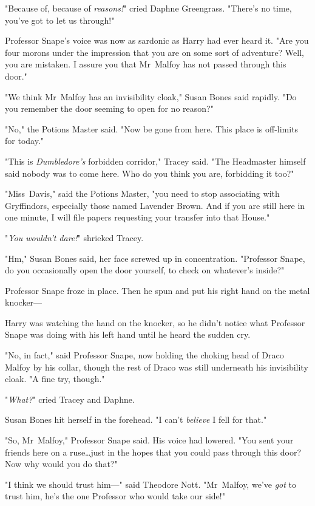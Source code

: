 "Because of, because of \emph{reasons!}" cried Daphne Greengrass. "There's no
time, you've got to let us through!"

Professor Snape's voice was now as sardonic as Harry had ever heard it. "Are
you four morons under the impression that you are on some sort of adventure?
Well, you are mistaken. I assure you that Mr~Malfoy has not passed through
this door."

"We think Mr~Malfoy has an invisibility cloak," Susan Bones said rapidly. "Do
you remember the door seeming to open for no reason?"

"No," the Potions Master said. "Now be gone from here. This place is off-limits
for today."

"This is \emph{Dumbledore's} forbidden corridor," Tracey said. "The Headmaster
himself said nobody was to come here. Who do you think you are, forbidding it
too?"

"Miss~Davis," said the Potions Master, "you need to stop associating with
Gryffindors, especially those named Lavender Brown. And if you are still here
in one minute, I will file papers requesting your transfer into that House."

"\emph{You wouldn't dare!}" shrieked Tracey.

"Hm," Susan Bones said, her face screwed up in concentration. "Professor Snape,
do you occasionally open the door yourself, to check on whatever's inside?"

Professor Snape froze in place. Then he spun and put his right hand on the
metal knocker—

Harry was watching the hand on the knocker, so he didn't notice what Professor
Snape was doing with his left hand until he heard the sudden cry.

"No, in fact," said Professor Snape, now holding the choking head of Draco
Malfoy by his collar, though the rest of Draco was still underneath his
invisibility cloak. "A fine try, though."

"\emph{What?}" cried Tracey and Daphne.

Susan Bones hit herself in the forehead. "I can't \emph{believe} I fell for
that."

"So, Mr~Malfoy," Professor Snape said. His voice had lowered. "You sent your
friends here on a ruse…just in the hopes that you could pass through
this door? Now why would you do that?"

"I think we should trust him—" said Theodore Nott. "Mr~Malfoy, we've
\emph{got} to trust him, he's the one Professor who would take our side!"

